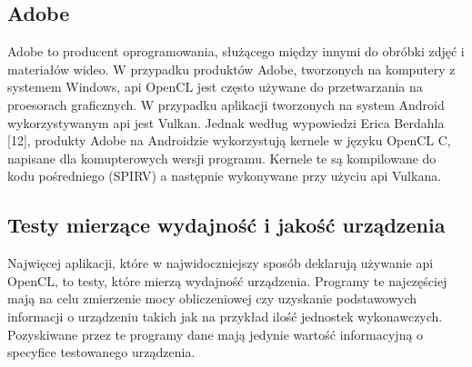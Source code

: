 \subsection[Adobe]{Adobe}
Adobe to producent oprogramowania, służącego między innymi do obróbki zdjęć i materiałów wideo. W przypadku produktów Adobe, tworzonych na komputery z systemem Windows, api OpenCL jest często używane do przetwarzania na proesorach graficznych. W przypadku aplikacji tworzonych na system Android wykorzystywanym api jest Vulkan. Jednak według wypowiedzi Erica Berdahla [12], produkty Adobe na Androidzie wykorzystują kernele w języku OpenCL C, napisane dla komupterowych wersji programu. Kernele te są kompilowane do kodu pośredniego (SPIRV) a następnie wykonywane przy użyciu api Vulkana.
\subsection[Testy mierzące wydajność i jakość urządzenia]{Testy mierzące wydajność i jakość urządzenia}
Najwięcej aplikacji, które w najwidoczniejszy sposób deklarują używanie api OpenCL, to testy, które mierzą wydajność urządzenia. Programy te najczęściej mają na celu zmierzenie mocy obliczeniowej czy uzyskanie podstawowych informacji o urządzeniu takich jak na przykład ilość jednostek wykonawczych. Pozyskiwane przez te programy dane mają jedynie wartość informacyjną o specyfice testowanego urządzenia.

